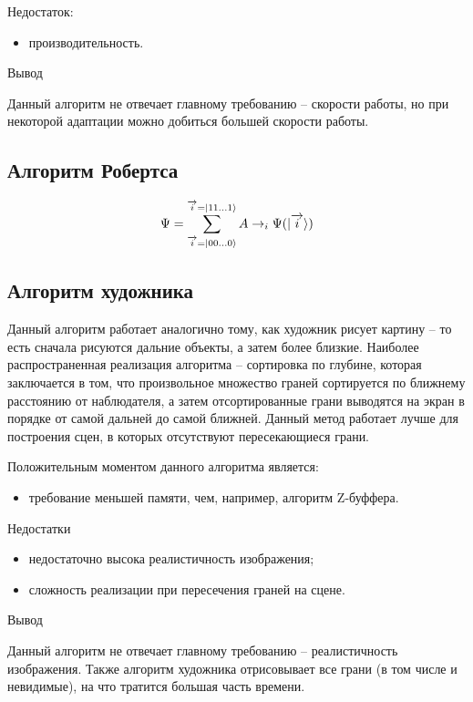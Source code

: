 Недостаток:
\begin{itemize}
\item	производительность.
\end{itemize}
Вывод

Данный алгоритм не отвечает главному требованию – скорости работы, но при некоторой адаптации можно добиться большей скорости работы. 



\subsection{Алгоритм Робертса}



\begin{equation} 
	\label{for:qint}
	\Psi = \sum\limits_{\overrightarrow{i}=\lvert00...0\rangle}^{\overrightarrow{i} = \lvert11...1\rangle} A \rightarrow_{i} \Psi(\lvert\overrightarrow{i}\rangle)
\end{equation}


\subsection{Алгоритм художника}

Данный алгоритм работает аналогично тому, как художник рисует картину – то есть сначала рисуются дальние объекты, а затем более близкие. Наиболее распространенная реализация алгоритма – сортировка по глубине, которая заключается в том, что произвольное множество граней сортируется по ближнему расстоянию от наблюдателя, а затем отсортированные грани выводятся на экран в порядке от самой дальней до самой ближней. Данный метод работает лучше для построения сцен, в которых отсутствуют пересекающиеся грани. 

Положительным моментом данного алгоритма является:
\begin{itemize}
\item	требование меньшей памяти, чем, например, алгоритм Z-буффера.
\end{itemize}

Недостатки

\begin{itemize}
\item	недостаточно высока реалистичность изображения;
\item	сложность реализации при пересечения граней на сцене.
\end{itemize}

Вывод

Данный алгоритм не отвечает главному требованию – реалистичность изображения. Также алгоритм художника отрисовывает все грани (в том числе и невидимые), на что тратится большая часть времени.


